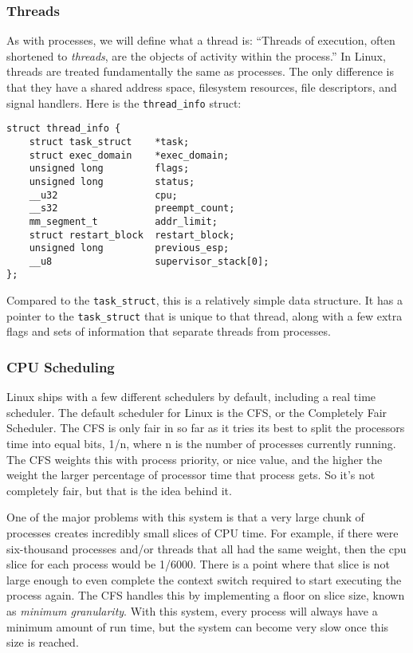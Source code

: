 \documentclass[10pt,letterpaper,onecolumn,draftclsnofoot]{IEEEtran}
\begin{document}
\subsubsection{Threads}
As with processes, we will define what a thread is: ``Threads of execution, often
shortened to \textit{threads}, are the objects of activity within the process.''
\cite{robertlove2010} In Linux, threads are treated fundamentally the same as
processes. The only difference is that they have a shared address space,
filesystem resources, file descriptors, and signal handlers. Here is the
\texttt{thread\_info} struct:\cite{robertlove2010}

\begin{lstlisting}[caption=The Linux thread\_info structure is how Linux tracks essential information about each thread and process]
struct thread_info {
	struct task_struct    *task;
	struct exec_domain    *exec_domain;
	unsigned long         flags;
	unsigned long         status;
	__u32                 cpu;
	__s32                 preempt_count;
	mm_segment_t          addr_limit;
	struct restart_block  restart_block;
	unsigned long         previous_esp;
	__u8                  supervisor_stack[0];
};
\end{lstlisting}

Compared to the \texttt{task\_struct}, this is a relatively simple data structure.
It has a pointer to the \texttt{task\_struct} that is unique to that thread,
along with a few extra flags and sets of information that separate threads from
processes.

\subsubsection{CPU Scheduling}
Linux ships with a few different schedulers by default, including a real time
scheduler.\cite{redhat2016} The default scheduler for Linux is the CFS, or
the Completely Fair Scheduler.
The CFS is only fair in so far as it tries its best to split the processors time
into equal bits, 1/n, where n is the number of processes currently running. The
CFS weights this with process priority, or nice value, and the higher the weight
the larger percentage of processor time that process gets. So it's not completely
fair, but that is the idea behind it.

One of the major problems with this system is that a very large chunk of processes
creates incredibly small slices of CPU time. For example, if there were six-thousand
processes and/or threads that all had the same weight, then the cpu slice for
each process would be 1/6000. There is a point where that slice is not large
enough to even complete the context switch required to start executing the process
again. The CFS handles this by implementing a floor on slice size, known as
\textit{minimum granularity}.\cite{robertlove2010} With this system, every process
will always have a minimum amount of run time, but the system can become very
slow once this size is reached.
\end{document}
